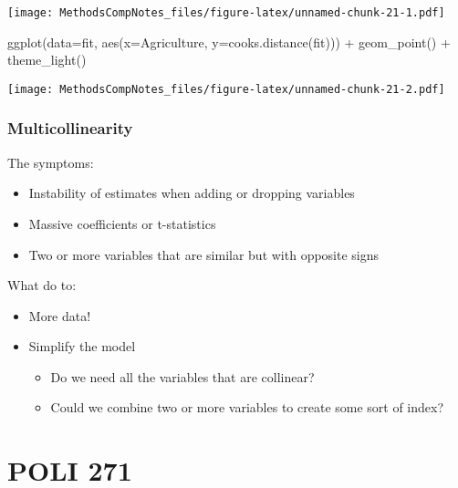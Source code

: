 \documentclass[
]{article}
\newenvironment{Shaded}{\begin{snugshade}}{\end{snugshade}}
\newcommand{\AttributeTok}[1]{\textcolor[rgb]{0.77,0.63,0.00}{#1}}
\newcommand{\FunctionTok}[1]{\textcolor[rgb]{0.00,0.00,0.00}{#1}}
\newcommand{\NormalTok}[1]{#1}
\newcommand{\SpecialCharTok}[1]{\textcolor[rgb]{0.00,0.00,0.00}{#1}}
\begin{document}
\texttt{[image: MethodsCompNotes\_files/figure-latex/unnamed-chunk-21-1.pdf]}

\begin{Shaded}
\begin{Highlighting}[]
\FunctionTok{ggplot}\NormalTok{(}\AttributeTok{data=}\NormalTok{fit, }\FunctionTok{aes}\NormalTok{(}\AttributeTok{x=}\NormalTok{Agriculture, }\AttributeTok{y=}\FunctionTok{cooks.distance}\NormalTok{(fit))) }\SpecialCharTok{+}
  \FunctionTok{geom\_point}\NormalTok{() }\SpecialCharTok{+}
  \FunctionTok{theme\_light}\NormalTok{()}
\end{Highlighting}
\end{Shaded}

\texttt{[image: MethodsCompNotes\_files/figure-latex/unnamed-chunk-21-2.pdf]}

\hypertarget{multicollinearity}{%
\subsubsection{Multicollinearity}\label{multicollinearity}}

The symptoms:

\begin{itemize}
\item
  Instability of estimates when adding or dropping variables
\item
  Massive coefficients or t-statistics
\item
  Two or more variables that are similar but with opposite signs
\end{itemize}

What do to:

\begin{itemize}
\item
  More data!
\item
  Simplify the model

  \begin{itemize}
  \item
    Do we need all the variables that are collinear?
  \item
    Could we combine two or more variables to create some sort of index?
  \end{itemize}
\end{itemize}

\hypertarget{poli-271}{%
\section{POLI 271}\label{poli-271}}
\end{document}
